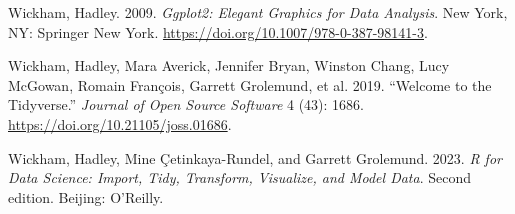 \documentclass[
  letterpaper,
]{scrbook}
\newlength{\cslhangindent}
\newlength{\cslentryspacingunit} %
\newenvironment{CSLReferences}[2] %
 {%
  \setlength{\parindent}{0pt}
  \ifodd #1
  \let\oldpar\par
  \def\par{\hangindent=\cslhangindent\oldpar}
  \fi
  \setlength{\parskip}{#2\cslentryspacingunit}
 }%
 {}
\begin{document}
\begin{CSLReferences}{1}{0}
\leavevmode{}%
Wickham, Hadley. 2009. \emph{Ggplot2: {Elegant Graphics} for {Data
Analysis}}. {New York, NY}: {Springer New York}.
\url{https://doi.org/10.1007/978-0-387-98141-3}.

\leavevmode{}%
Wickham, Hadley, Mara Averick, Jennifer Bryan, Winston Chang, Lucy
McGowan, Romain François, Garrett Grolemund, et al. 2019. {``Welcome to
the {Tidyverse}.''} \emph{Journal of Open Source Software} 4 (43): 1686.
\url{https://doi.org/10.21105/joss.01686}.

\leavevmode{}%
Wickham, Hadley, Mine Çetinkaya-Rundel, and Garrett Grolemund. 2023.
\emph{R for Data Science: Import, Tidy, Transform, Visualize, and Model
Data}. Second edition. {Beijing}: {O'Reilly}.

\end{CSLReferences}


\backmatter
\end{document}
